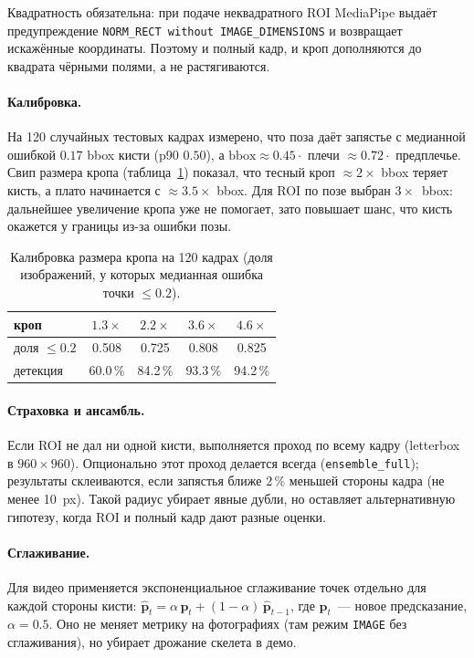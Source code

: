 \documentclass[11pt,a4paper]{article}
\begin{document}
Квадратность обязательна: при подаче неквадратного ROI MediaPipe выдаёт
предупреждение \texttt{NORM\_RECT without IMAGE\_DIMENSIONS} и возвращает
искажённые координаты. Поэтому и полный кадр, и кроп дополняются до квадрата
чёрными полями, а не растягиваются.

\paragraph{Калибровка.} На 120 случайных тестовых кадрах измерено, что поза
даёт запястье с медианной ошибкой \(0.17\) bbox кисти (p90 \(0.50\)), а
\( \text{bbox} \approx 0.45\cdot\) плечи \(\approx 0.72\cdot\) предплечье.
Свип размера кропа (таблица~\ref{tab:calib}) показал, что тесный кроп
\(\approx 2\times\) bbox теряет кисть, а плато начинается с
\(\approx 3.5\times\) bbox. Для ROI по позе выбран \(3\times\)~bbox:
дальнейшее увеличение кропа уже не помогает, зато повышает шанс, что кисть
окажется у границы из-за ошибки позы.

\begin{table}[h]
  \centering
  \caption{Калибровка размера кропа на 120 кадрах (доля изображений, у которых
  медианная ошибка точки \(\le 0.2\)).}
  \label{tab:calib}
  \begin{tabular}{lcccc}
    \toprule
    кроп & \(1.3\times\) & \(2.2\times\) & \(3.6\times\) & \(4.6\times\) \\
    \midrule
    доля \(\le 0.2\) & 0.508 & 0.725 & 0.808 & 0.825 \\
    детекция & 60.0\,\% & 84.2\,\% & 93.3\,\% & 94.2\,\% \\
    \bottomrule
  \end{tabular}
\end{table}

\paragraph{Страховка и ансамбль.} Если ROI не дал ни одной кисти, выполняется
проход по всему кадру (letterbox в \(960\times960\)). Опционально этот проход
делается всегда (\texttt{ensemble\_full}); результаты склеиваются, если запястья
ближе \(2\,\%\) меньшей стороны кадра (не менее 10~px). Такой радиус убирает
явные дубли, но оставляет альтернативную гипотезу, когда ROI и полный кадр
дают разные оценки.

\paragraph{Сглаживание.} Для видео применяется экспоненциальное сглаживание
точек отдельно для каждой стороны кисти:
\(\hat{\mathbf{p}}_t = \alpha\,\mathbf{p}_t + (1-\alpha)\,\hat{\mathbf{p}}_{t-1}\),
где \(\mathbf{p}_t\)~--- новое предсказание, \(\alpha=0.5\). Оно не меняет
метрику на фотографиях (там режим \texttt{IMAGE} без сглаживания), но убирает
дрожание скелета в демо.
\end{document}
